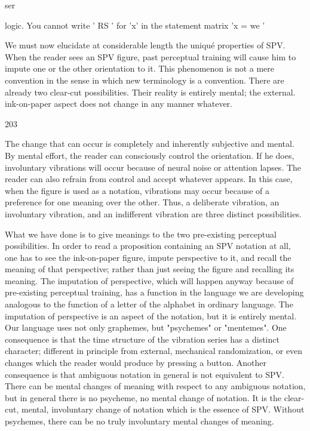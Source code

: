 \documentclass[10pt,twoside]{memoir}
\begin{document}
\begin{enumerate}
{{{{{ser 


logic. You cannot write ' RS ' for 'x' in the statement matrix 'x 
= we ' 

We must now elucidate at considerable length the uniqué properties of 
SPV. When the reader sees an SPV figure, past perceptual training will cause 
him to impute one or the other orientation to it. This phenomenon is not a 
mere convention in the sense in which new terminology is a convention. 
There are already two clear-cut possibilities. Their reality is entirely mental; 
the external. ink-on-paper aspect does not change in any manner whatever. 


203 


The change that can occur is completely and inherently subjective and 
mental. By mental effort, the reader can consciously control the orientation. 
If he does, involuntary vibrations will occur because of neural noise or 
attention lapses. The reader can also refrain from control and accept 
whatever appears. In this case, when the figure is used as a notation, 
vibrations may occur because of a preference for one meaning over the 
other. Thus, a deliberate vibration, an involuntary vibration, and an 
indifferent vibration are three distinct possibilities. 

What we have done is to give meanings to the two pre-existing 
perceptual possibilities. In order to read a proposition containing an SPV 
notation at all, one has to see the ink-on-paper figure, impute perspective to 
it, and recall the meaning of that perspective; rather than just seeing the 
figure and recalling its meaning. The imputation of perspective, which will 
happen anyway because of pre-existing perceptual training, has a function in 
the language we are developing analogous to the function of a letter of the 
alphabet in ordinary language. The imputation of perspective is an aspect of 
the notation, but it is entirely mental. Our language uses not only 
graphemes, but "psychemes" or "mentemes". One consequence is that the 
time structure of the vibration series has a distinct character; different in 
principle from external, mechanical randomization, or even changes which 
the reader would produce by pressing a button. Another consequence is that 
ambiguous notation in general is not equivalent to SPV. There can be mental 
changes of meaning with respect to any ambiguous notation, but in general 
there is no psycheme, no mental change of notation. It is the clear-cut, 
mental, involuntary change of notation which is the essence of SPV. Without 
psychemes, there can be no truly involuntary mental changes of meaning. 


}}}}}
\end{enumerate}
\end{document}
